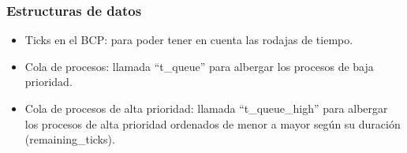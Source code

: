 \documentclass[10pt, spanish, pdftex]{template/UC3M_document}
\begin{document}
\subsubsection{Estructuras de datos}
\vspace{-2mm}
\begin{itemize}
\setlength{\itemsep}{-1.5mm}
    \item Ticks en el BCP: para poder tener en cuenta las rodajas de tiempo.
    \item Cola de procesos: llamada “t\_queue” para albergar los procesos de baja prioridad.
    \item Cola de procesos de alta prioridad: llamada “t\_queue\_high” para albergar los procesos de alta prioridad ordenados de menor a mayor según su duración (remaining\_ticks).
\end{itemize}
\end{document}
